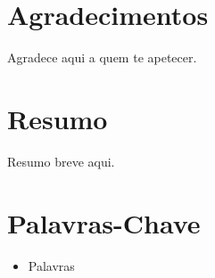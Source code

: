 \chapter*{Agradecimentos}
\label{chap:ack}
\vspace{0.7cm}

Agradece aqui a quem te apetecer.

\chapter*{Resumo}
\label{chap:res}
\vspace{0.7cm}

Resumo breve aqui.

\chapter*{Palavras-Chave}
\label{chap:res}
\vspace{0.7cm}

\begin{itemize}
    \item Palavras
\end{itemize}